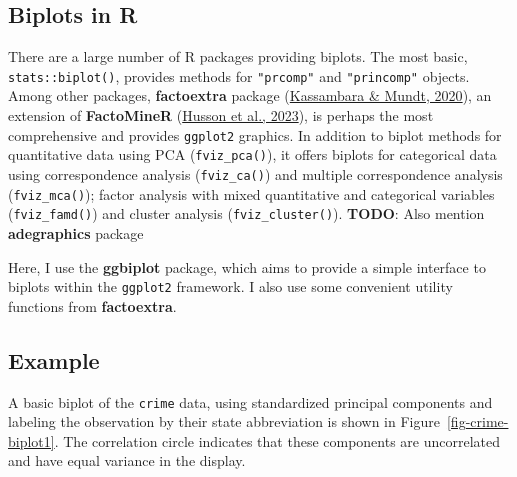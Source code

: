 \documentclass[
  letterpaper,
  10pt,
  krantz2]{krantz}
\makeatletter
\newenvironment{Shaded}{\begin{snugshade}}{\end{snugshade}}
\newcommand{\AttributeTok}[1]{\textcolor[rgb]{0.40,0.45,0.13}{#1}}
\newcommand{\CommentTok}[1]{\textcolor[rgb]{0.37,0.37,0.37}{#1}}
\newcommand{\ConstantTok}[1]{\textcolor[rgb]{0.56,0.35,0.01}{#1}}
\newcommand{\DecValTok}[1]{\textcolor[rgb]{0.68,0.00,0.00}{#1}}
\newcommand{\FunctionTok}[1]{\textcolor[rgb]{0.28,0.35,0.67}{#1}}
\newcommand{\NormalTok}[1]{\textcolor[rgb]{0.00,0.23,0.31}{#1}}
\newcommand{\OtherTok}[1]{\textcolor[rgb]{0.00,0.23,0.31}{#1}}
\newcommand{\SpecialCharTok}[1]{\textcolor[rgb]{0.37,0.37,0.37}{#1}}
\newcommand{\StringTok}[1]{\textcolor[rgb]{0.13,0.47,0.30}{#1}}
\newenvironment{kframe}{%
  \medskip{}
  \setlength{\fboxsep}{.8em}
  \def\at@end@of@kframe{}%
  \ifinner\ifhmode%
  \def\at@end@of@kframe{\end{minipage}}%
  \begin{minipage}{\columnwidth}%
  \fi\fi%
  \def\FrameCommand##1{\hskip\@totalleftmargin \hskip-\fboxsep
  \colorbox{shadecolor}{##1}\hskip-\fboxsep
      \hskip-\linewidth \hskip-\@totalleftmargin \hskip\columnwidth}%
  \MakeFramed {\advance\hsize-\width
    \@totalleftmargin\z@ \linewidth\hsize
    \@setminipage}}%
{\par\unskip\endMakeFramed%
  \at@end@of@kframe}
\renewenvironment{Shaded}{\begin{kframe}}{\end{kframe}}
\makeatother
\begin{document}
\hypertarget{biplots-in-r}{%
\subsection{Biplots in R}\label{biplots-in-r}}

There are a large number of R packages providing biplots. The most
basic, \texttt{stats::biplot()}, provides methods for \texttt{"prcomp"}
and \texttt{"princomp"} objects. Among other packages,
\textbf{factoextra} package
(\protect\hyperlink{ref-R-factoextra}{Kassambara \& Mundt, 2020}), an
extension of \textbf{FactoMineR}
(\protect\hyperlink{ref-R-FactoMineR}{Husson et al., 2023}), is perhaps
the most comprehensive and provides \texttt{ggplot2} graphics. In
addition to biplot methods for quantitative data using PCA
(\texttt{fviz\_pca()}), it offers biplots for categorical data using
correspondence analysis (\texttt{fviz\_ca()}) and multiple
correspondence analysis (\texttt{fviz\_mca()}); factor analysis with
mixed quantitative and categorical variables (\texttt{fviz\_famd()}) and
cluster analysis (\texttt{fviz\_cluster()}). \textbf{TODO}: Also mention
\textbf{adegraphics} package

Here, I use the \textbf{ggbiplot} package, which aims to provide a
simple interface to biplots within the \texttt{ggplot2} framework. I
also use some convenient utility functions from \textbf{factoextra}.

\hypertarget{example}{%
\subsection{Example}\label{example}}

A basic biplot of the \texttt{crime} data, using standardized principal
components and labeling the observation by their state abbreviation is
shown in Figure~\ref{fig-crime-biplot1}. The correlation circle
indicates that these components are uncorrelated and have equal variance
in the display.

\begin{Shaded}
\end{Shaded}
\end{document}
